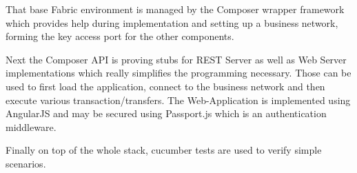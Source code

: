 That base Fabric environment is managed by the Composer wrapper framework which provides help during implementation and setting up a business network, forming the key access port for the other components.

Next the Composer API is proving stubs for REST Server as well as Web Server implementations which really simplifies the programming necessary. Those can be used to first load the application, connect to the business network and then execute various transaction/transfers. The Web-Application is implemented using AngularJS and may be secured using Passport.js which is an authentication middleware.

Finally on top of the whole stack, cucumber tests are used to verify simple scenarios.


